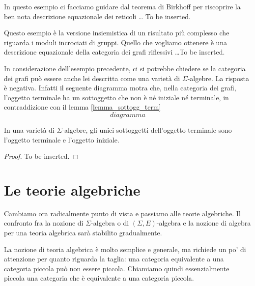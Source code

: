 \begin{example}\label{esempio_Birkhoff_reticoli}
In questo esempio ci facciamo guidare dal teorema di Birkhoff per riscoprire la ben nota descrizione equazionale dei reticoli \ldots
To be inserted.
\end{example} 

\begin{example}\label{esempio_grafi_riflessivi}
Questo esempio è la versione insiemistica di un risultato più complesso che riguarda i moduli incrociati di gruppi. Quello che 
vogliamo ottenere è una descrizione equazionale della categoria dei grafi riflessivi \ldots To be inserted.
\end{example}

\begin{example}\label{esempio_grafi_noneq}
In considerazione dell'esempio precedente, ci si potrebbe chiedere se la categoria dei grafi può essere anche lei descritta come una
varietà di $\Sigma$-algebre. La risposta è negativa. Infatti il seguente diagramma motra che, nella categoria dei grafi, l'oggetto terminale
ha un sottoggetto che non è né iniziale né terminale, in contraddizione con il lemma \ref{lemma_sottogg_term}
$$diagramma$$
\end{example}

\begin{lemma}\label{lemma_sottogg_term}
In una varietà di $\Sigma$-algebre, gli unici sottoggetti dell'oggetto terminale sono l'oggetto terminale e l'oggetto iniziale.
\end{lemma}

\begin{proof}
To be inserted.
\end{proof}

\section{Le teorie algebriche}\label{sec_teorie_alg}

Cambiamo ora radicalmente punto di vista e passiamo alle teorie algebriche. Il confronto fra la nozione di $\Sigma$-algebra
o di $(\Sigma,E)$-algebra e la nozione di algebra per una teoria algebrica sarà stabilito gradualmente.

La nozione di teoria algebrica è molto semplice e generale, ma richiede un po' di attenzione per quanto riguarda la taglia: una
categoria equivalente a una categoria piccola può non essere piccola. Chiamiamo quindi essenzialmente piccola una categoria 
che è equivalente a una categoria piccola.

